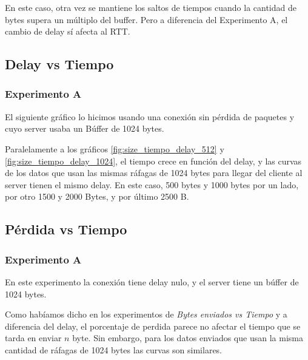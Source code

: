   
  
  En este caso, otra vez se mantiene los saltos de tiempos cuando la cantidad de bytes supera un m\'ultiplo del buffer. Pero a diferencia del Experimento A, el cambio de delay s\'i afecta al RTT. 

\subsection{Delay vs Tiempo}
\subsubsection{Experimento A}

  El siguiente gr\'afico lo hicimos usando una conexi\'on sin p\'erdida de paquetes y cuyo server usaba un B\'uffer de 1024 bytes.


  Paralelamente a los gr\'aficos \ref{fig:size_tiempo_delay_512} y \ref{fig:size_tiempo_delay_1024}, el tiempo crece en funci\'on del delay, y las curvas de los datos que usan las mismas r\'afagas de 1024 bytes para llegar del cliente al server tienen el mismo delay. En este caso, 500 bytes y 1000 bytes por un lado, por otro 1500 y 2000 Bytes, y por \'ultimo 2500 B. 

\subsection{P\'erdida vs Tiempo}
\subsubsection{Experimento A}

  En este experimento la conexi\'on tiene delay nulo, y el server tiene un b\'uffer de 1024 bytes. 
  
  
  Como hab\'iamos dicho en los experimentos de \textit{Bytes enviados vs Tiempo} y a diferencia del delay, el porcentaje de perdida parece no afectar el tiempo que se tarda en enviar $n$ byte. Sin embargo, para los datos enviados que usan la misma cantidad de r\'afagas de 1024 bytes las curvas son similares. 

